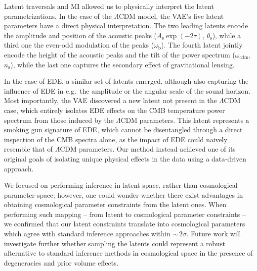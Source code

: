 \documentclass[aps, prd, reprint, superscriptaddress, nofootinbib, bibnotes]{revtex4-2}
\begin{document}
Latent traversals and MI allowed us to physically interpret the latent parametrizations. In the case of the $\Lambda$CDM model, the VAE's five latent parameters have a direct physical interpretation. The two leading latents encode the amplitude and position of the acoustic peaks ($A_\mathrm{s}\exp({-2\tau})$, $\theta_\mathrm{s}$), while a third one the even-odd modulation of the peaks ($\omega_\mathrm{b}$). The fourth latent jointly encode the height of the acoustic peaks and the tilt of the power spectrum ($\omega_\mathrm{cdm}$, $n_\mathrm{s}$), while the last one captures the secondary effect of gravitational lensing.

In the case of EDE, a similar set of latents emerged, although also capturing the influence of EDE in e.g.\ the amplitude or the angular scale of the sound horizon. Most importantly, the VAE discovered a new latent not present in the $\Lambda$CDM case, which entirely isolates EDE effects on the CMB temperature power spectrum from those induced by the $\Lambda$CDM parameters. This latent represents a smoking gun signature of EDE, which cannot be disentangled through a direct inspection of the CMB spectra alone, as the impact of EDE could naively resemble that of $\Lambda$CDM parameters. 
Our method instead achieved one of its original goals of isolating unique physical effects in the data using a data-driven approach.

We focused on performing inference in latent space, rather than cosmological parameter space; however, one could wonder whether there exist advantages in obtaining cosmological parameter constraints from the latent ones. 
When performing such mapping -- from latent to cosmological parameter constraints -- we confirmed that our latent constraints translate into cosmological parameters which agree with standard inference approaches within $\sim\,2\sigma$. Future work will investigate further whether sampling the latents could represent a robust alternative to standard inference methods in cosmological space in the presence of degeneracies and prior volume effects.
\end{document}
